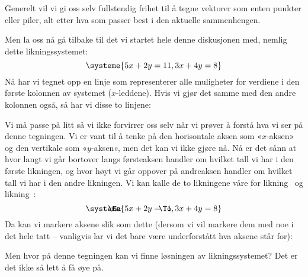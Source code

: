 Generelt vil vi gi oss selv fullstendig frihet til å tegne vektorer
som enten punkter eller piler, alt etter hva som passer best i den
aktuelle sammenhengen.

Men la oss nå gå tilbake til det vi startet hele denne diskusjonen
med, nemlig dette likningssystemet:
\[
\systeme{
5x + 2y = 11,
3x + 4y = 8
}
\]
Nå har vi tegnet opp en linje som representerer alle muligheter for
verdiene i den første kolonnen av systemet ($x$-leddene).  Hvis vi
gjør det samme med den andre kolonnen også, så har vi disse to
linjene:
\begin{center}
\end{center}
Vi må passe på litt så vi ikke forvirrer oss selv når vi prøver å
forstå hva vi ser på denne tegningen.  Vi er vant til å tenke på den
horisontale aksen som «$x$-aksen» og den vertikale som «$y$-aksen»,
men det kan vi ikke gjøre nå.  Nå er det sånn at hvor langt vi går
bortover langs førsteaksen handler om hvilket tall vi har i den første
likningen, og hvor høyt vi går oppover på andreaksen handler om
hvilket tall vi har i den andre likningen.
Vi kan kalle de to likningene våre for likning~\En{} og likning~\To:
\[
\systeme{
\makebox[0pt][l]{\hspace{-2em}\En} 5x + 2y = 11,
\makebox[0pt][l]{\hspace{-2em}\To} 3x + 4y = 8
}
\]
Da kan vi markere aksene slik som dette (dersom vi vil markere dem med
noe i det hele tatt -- vanligvis lar vi det bare være underforstått
hva aksene står for):
\begin{center}
\end{center}
Men hvor på denne tegningen kan vi finne løsningen av
likningssystemet?  Det er det ikke så lett å få øye på.

